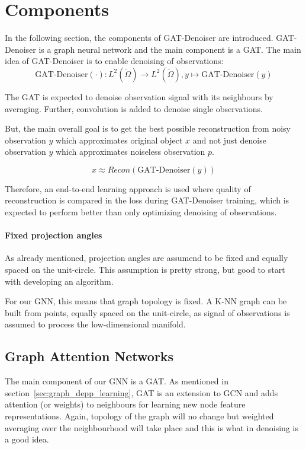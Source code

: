 \section{Components}
In the following section, the components of GAT-Denoiser are introduced. 
GAT-Denoiser is a graph neural network and the main component is a GAT. 
The main idea of GAT-Denoiser is to enable denoising of observations:
\begin{equation}
  \text{GAT-Denoiser} (\cdot) : L^2(\tilde{\Omega}) \to  L^2(\tilde{\Omega}) , y \mapsto \text{GAT-Denoiser} (y) 
\end{equation}

The GAT is expected to denoise observation signal with its neighbours by averaging. 
Further, convolution is added to denoise single observations.


But, the main overall goal is to get the best possible reconstruction 
from noisy observation $y$ which approximates original object $x$ and 
not just denoise observation $y$ which approximates noiseless observation $p$.


\begin{equation}
  x \approx   Recon \left( \text{GAT-Denoiser} \left( y \right) \right)
\end{equation}

Therefore, an end-to-end learning approach is used where quality of reconstruction is 
compared in the loss during GAT-Denoiser training, which is expected to perform better than 
only optimizing denoising of observations.

\paragraph{Fixed projection angles}
As already mentioned, projection angles are assumend to be fixed and equally spaced on the unit-circle.
This assumption is pretty strong, but good to start with developing an algorithm.

\begin{tcolorbox}[colback=red!5!white,colframe=red!75!black]
  For our GNN, this means that graph topology is fixed. 
  A K-NN graph can be built from points, equally spaced on the unit-circle,
  as signal of observations is assumed to process the low-dimensional manifold.
\end{tcolorbox}



\subsection{Graph Attention Networks}
The main component of our GNN is a GAT.
As mentioned in section~\ref{sec:graph_depp_learning}, GAT is an extension to GCN and 
adds attention (or weights) to neighbours for learning new node feature representations. 
Again, topology of the graph will no change but weighted averaging over the neighbourhood 
will take place and this is what in denoising is a good idea.

